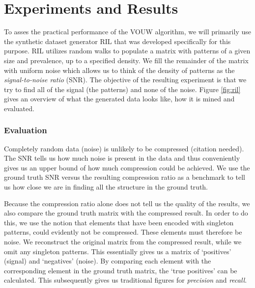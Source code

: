 \documentclass{llncs}
\begin{document}
\section{Experiments and Results}

To asses the practical performance of the VOUW algorithm, we will primarily use the synthetic dataset generator RIL that was developed specifically for this purpose. RIL utilizes random walks to populate a matrix with patterns of a given size and prevalence, up to a specified density. We fill the remainder of the matrix with uniform noise which allows us to think of the density of patterns as the \emph{signal-to-noise ratio} (SNR). The objective of the resulting experiment is that we try to find all of the signal (the patterns) and none of the noise. Figure \ref{fig:ril} gives an overview of what the generated data looks like, how it is mined and evaluated.

\subsubsection{Evaluation}

Completely random data (noise) is unlikely to be compressed (citation needed). The SNR tells us how much noise is present in the data and thus conveniently gives us an upper bound of how much compression could be achieved. We use the ground truth SNR versus the resulting compression ratio as a benchmark to tell us how close we are in finding all the structure in the ground truth. 

Because the compression ratio alone does not tell us the quality of the results, we also compare the ground truth matrix with the compressed result. In order to do this, we use the notion that elements that have been encoded with singleton patterns, could evidently not be compressed. These elements must therefore be noise. We reconstruct the original matrix from the compressed result, while we omit any singleton patterns. This essentially gives us a matrix of `positives' (signal) and `negatives' (noise). By comparing each element with the corresponding element in the ground truth matrix, the `true positives' can be calculated. This subsequently gives us traditional  figures for \emph{precision} and \emph{recall}.
\end{document}
